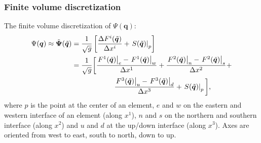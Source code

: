 \documentclass[12pt]{article}
\begin{document}
\subsubsection{Finite volume discretization}

The finite volume discretization of $\Psi(\bm{q})$:
\begin{align}
    \Psi(\bm{q}) \approx  \tilde{\bm{\Psi}}(\tilde{\bm{q}})
    &= \dfrac{1}{\sqrt{g}} \left[ \dfrac{\Delta F^i(\tilde{\bm{q}})}{\Delta x^i} + 
        \left.S(\tilde{\bm{q}})\right|_{p} \right] \\
    &= \dfrac{1}{\sqrt{g}} \bigg[ 
        \dfrac{\left. F^1(\tilde{\bm{q}}) \right|_{e} - \left.F^1(\tilde{\bm{q}}) \right|_{w} }{\Delta x^1} +
        \dfrac{\left. F^2(\tilde{\bm{q}}) \right|_{n} - \left.F^2(\tilde{\bm{q}}) \right|_{s} }{\Delta x^2} +
        \notag\\ & \qquad\qquad\qquad
        \dfrac{\left. F^3(\tilde{\bm{q}}) \right|_{u} - \left.F^3(\tilde{\bm{q}}) \right|_{d} }{\Delta x^3} +
        \left.S(\tilde{\bm{q}})\right|_{p}
     \bigg]
    \text{,}
\end{align}
where $p$ is the point at the center of an element, $e$ and $w$ on the eastern and western interface of an element (along $x^1$), $n$ and $s$ on the northern and southern interface (along $x^2$) and $u$ and $d$ at the up/down interface (along $x^3$).
Axes are oriented from west to east, south to north, down to up.
\end{document}
